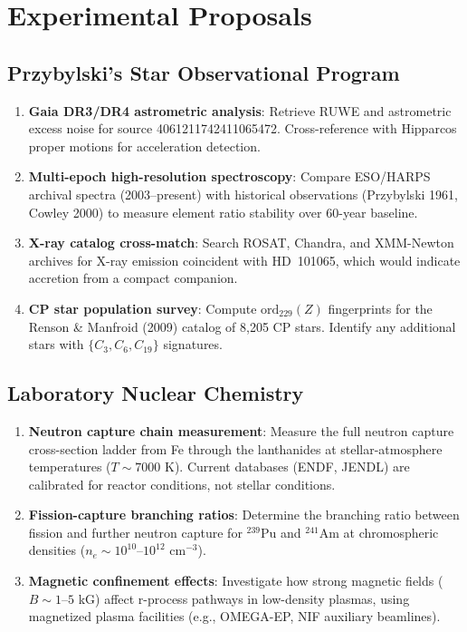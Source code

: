 \section{Experimental Proposals}
\label{sec:experiments}

\subsection{Przybylski's Star Observational Program}

\begin{enumerate}
  \item \textbf{Gaia DR3/DR4 astrometric analysis}: Retrieve RUWE and astrometric
    excess noise for source 4061211742411065472. Cross-reference with Hipparcos
    proper motions for acceleration detection.

  \item \textbf{Multi-epoch high-resolution spectroscopy}: Compare ESO/HARPS archival
    spectra (2003--present) with historical observations (Przybylski 1961, Cowley 2000)
    to measure element ratio stability over 60-year baseline.

  \item \textbf{X-ray catalog cross-match}: Search ROSAT, Chandra, and XMM-Newton
    archives for X-ray emission coincident with HD~101065, which would indicate
    accretion from a compact companion.

  \item \textbf{CP star population survey}: Compute $\text{ord}_{229}(Z)$ fingerprints
    for the Renson \& Manfroid (2009) catalog of 8,205 CP stars. Identify any
    additional stars with $\{C_3, C_6, C_{19}\}$ signatures.
\end{enumerate}

\subsection{Laboratory Nuclear Chemistry}

\begin{enumerate}
  \item \textbf{Neutron capture chain measurement}: Measure the full neutron capture
    cross-section ladder from Fe through the lanthanides at stellar-atmosphere
    temperatures ($T \sim 7000$ K). Current databases (ENDF, JENDL) are calibrated
    for reactor conditions, not stellar conditions.

  \item \textbf{Fission-capture branching ratios}: Determine the branching ratio
    between fission and further neutron capture for $^{239}$Pu and $^{241}$Am at
    chromospheric densities ($n_e \sim 10^{10}$--$10^{12}$ cm$^{-3}$).

  \item \textbf{Magnetic confinement effects}: Investigate how strong magnetic fields
    ($B \sim 1$--$5$ kG) affect r-process pathways in low-density plasmas, using
    magnetized plasma facilities (e.g., OMEGA-EP, NIF auxiliary beamlines).
\end{enumerate}

